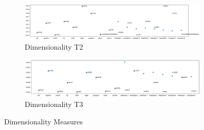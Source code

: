 \begin{figure}[h!]
    \centering
    \begin{subfigure}{0.496\textwidth}
        \includegraphics[width=0.99\textwidth]{figures/dimensionality-T2.png}
        \caption{Dimensionality T2}
        \label{fig:dimensionality-t2}
    \end{subfigure}
    \begin{subfigure}{0.496\textwidth}
        \includegraphics[width=0.99\textwidth]{figures/dimensionality-T3.png}
        \caption{Dimensionality T3}
        \label{fig:dimensionality-t3}
    \end{subfigure}
    \caption{Dimensionality Measures}
    \label{fig:dimensionality}
\end{figure}


